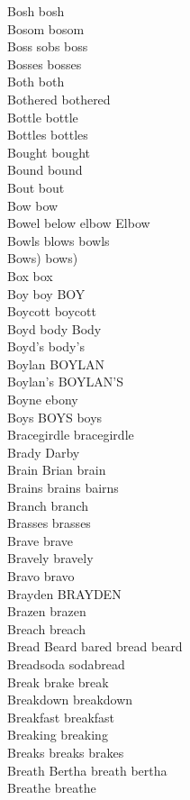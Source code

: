 Bosh bosh\\
Bosom bosom\\
Boss sobs boss\\
Bosses bosses\\
Both both\\
Bothered bothered\\
Bottle bottle\\
Bottles bottles\\
Bought bought\\
Bound bound\\
Bout bout\\
Bow bow\\
Bowel below elbow Elbow\\
Bowls blows bowls\\
Bows) bows)\\
Box box\\
Boy boy BOY\\
Boycott boycott\\
Boyd body Body\\
Boyd's body's\\
Boylan BOYLAN\\
Boylan's BOYLAN'S\\
Boyne ebony\\
Boys BOYS boys\\
Bracegirdle bracegirdle\\
Brady Darby\\
Brain Brian brain\\
Brains brains bairns\\
Branch branch\\
Brasses brasses\\
Brave brave\\
Bravely bravely\\
Bravo bravo\\
Brayden BRAYDEN\\
Brazen brazen\\
Breach breach\\
Bread Beard bared bread beard\\
Breadsoda sodabread\\
Break brake break\\
Breakdown breakdown\\
Breakfast breakfast\\
Breaking breaking\\
Breaks breaks brakes\\
Breath Bertha breath bertha\\
Breathe breathe\\
